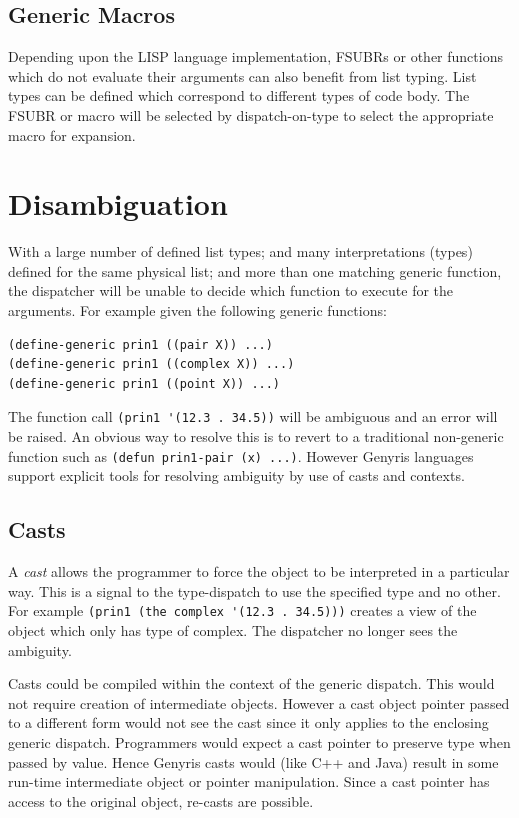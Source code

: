 \documentclass[a4paper,12pt,dvips]{article}
\begin{document}
\subsection{Generic Macros}
Depending upon the LISP language implementation, FSUBRs or other functions which do not evaluate their arguments can also benefit from list typing. List types can be defined which correspond to different types of code body. The FSUBR or macro will be selected by dispatch-on-type to select the appropriate macro for expansion. 

\section{Disambiguation}
With a large number of defined list types; and many interpretations (types) defined for the same physical list; and more than one matching generic function, the dispatcher will be unable to decide which function to execute for the arguments. 
For example given the following generic functions:
\begin{verbatim}
(define-generic prin1 ((pair X)) ...)
(define-generic prin1 ((complex X)) ...)
(define-generic prin1 ((point X)) ...)
\end{verbatim}
The function call \verb|(prin1 '(12.3 . 34.5))| will be ambiguous and an error will be raised. An obvious way to resolve this is to revert to a traditional non-generic function such as \verb|(defun prin1-pair (x) ...)|. However Genyris languages support explicit tools for resolving ambiguity by use of casts and contexts. 

\subsection{Casts}
A \emph{cast} allows the programmer to force the object to be interpreted in a particular way. This is a signal to the type-dispatch to use the specified type and no other. For example
\verb|(prin1 (the complex '(12.3 . 34.5)))|
creates a view of the object which only has type of complex. The dispatcher no longer sees the ambiguity.

Casts could be compiled within the context of the generic dispatch. This would not require creation of intermediate objects. However a cast object pointer passed to a different form would not see the cast since it only applies to the enclosing generic dispatch. Programmers would expect a cast pointer to preserve type when passed by value. Hence Genyris casts would (like C++ and Java) result in some run-time intermediate object or pointer manipulation.  Since a cast pointer has access to the original object, re-casts are possible.   
\end{document}
